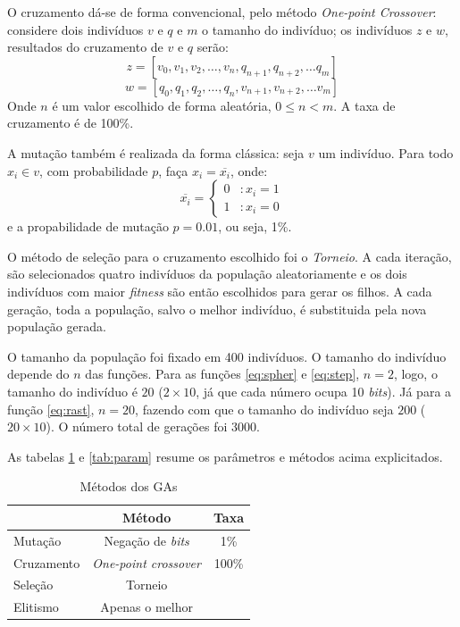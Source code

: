 \documentclass[12pt]{article}
\begin{document}
O cruzamento dá-se de forma convencional, pelo método \emph{One-point Crossover}: considere dois indivíduos $v$ e $q$ e $m$ o tamanho do indivíduo; os indivíduos $z$ e $w$, resultados do cruzamento de $v$ e $q$ serão:
\[
  z = [v_0, v_1, v_2, \dots, v_n, q_{n+1}, q_{n+2}, \dots q_m]
\]
\[
   w = [q_0, q_1, q_2, \dots, q_n, v_{n+1}, v_{n+2}, \dots v_m]
\]
Onde $n$ é um valor escolhido de forma aleatória, $ 0 \le n < m$.
A taxa de cruzamento é de 100\%.

A mutação também é realizada da forma clássica: seja $v$ um indivíduo. Para todo $x_i \in v$, com probabilidade $p$, faça $x_i = \overline{x_i}$, onde:
 \begin{displaymath}
   \overline{x_i} = \left\{
     \begin{array}{lr}
       0 & : x_i = 1 \\
       1 & : x_i = 0
     \end{array}
   \right.
\end{displaymath} 
e a propabilidade de mutação $p = 0.01$, ou seja, 1\%. 

O método de seleção para o cruzamento escolhido foi o \emph{Torneio}. A cada iteração, são selecionados quatro indivíduos da população aleatoriamente e os dois indivíduos com maior \emph{fitness} são então escolhidos para gerar os filhos. A cada geração, toda a população, salvo o melhor indivíduo, é substituida pela nova população gerada.

O tamanho da população foi fixado em 400 indivíduos. O tamanho do indivíduo depende do $n$ das funções. Para as funções \ref{eq:spher} e \ref{eq:step}, $n = 2$, logo, o tamanho do indivíduo é $20$ ($2 \times 10$, já que cada número ocupa 10 \emph{bits}). Já para a função \ref{eq:rast}, $n = 20$, fazendo com que o tamanho do indivíduo seja $200$ ($20 \times 10$). O número total de gerações foi $3000$.


As tabelas \ref{tab:met} e \ref{tab:param} resume os parâmetros e métodos acima explicitados.

\begin{table} 
  \centering
  \begin{tabular}{l|c|c|}
    \cline{2-3} 
    & \textbf{Método} & \textbf{Taxa}\\ \hline
    \multicolumn{1}{|l|}{Mutação} & Negação de \emph{bits} & 1\% \\ \hline
    \multicolumn{1}{|l|}{Cruzamento} & \emph{One-point crossover} & 100\%  \\ \hline
    \multicolumn{1}{|l|}{Seleção} & Torneio  \\ \cline{0-1}
    \multicolumn{1}{|l|}{Elitismo} & Apenas o melhor \\ \cline{0-1}
  \end{tabular}
  \caption{Métodos dos GAs}
  \label{tab:met}
\end{table}
\end{document}
